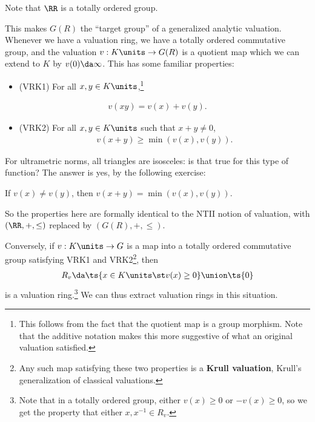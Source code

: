 \begin{remark}

Note that \(\RR\) is a totally ordered group.

\end{remark}

This makes \(G(R)\) the ``target group'' of a generalized analytic
valuation. Whenever we have a valuation ring, we have a totally ordered
commutative group, and the valuation \(v: K\units \to G(R)\) is a
quotient map which we can extend to \(K\) by \(v(0) \da \infty\). This
has some familiar properties:

\begin{itemize}
\tightlist
\item
  (VRK1) For all \(x,y\in K\units\),\footnote{This follows from the fact
    that the quotient map is a group morphism. Note that the additive
    notation makes this more suggestive of what an original valuation
    satisfied.}
\end{itemize}

\begin{align*}  
v(xy) = v(x) + v(y)
.\end{align*}

\begin{itemize}
\tightlist
\item
  (VRK2) For all \(x,y \in K\units\) such that \(x+y\neq 0\),
  \begin{align*}  
  v(x+y) \geq \min(v(x), v(y))
  .\end{align*}
\end{itemize}

For ultrametric norms, all triangles are isosceles: is that true for
this type of function? The answer is yes, by the following exercise:

\begin{exercise}[?]

If \(v(x) \neq v(y)\), then \(v(x+y) = \min(v(x), v(y))\).

\end{exercise}

So the properties here are formally identical to the NTII notion of
valuation, with \((\RR, +, \leq)\) replaced by \((G(R), +, \leq)\).

\begin{exercise}[?]

Conversely, if \(v: K\units \to G\) is a map into a totally ordered
commutative group satisfying VRK1 and VRK2\footnote{Any such map
  satisfying these two properties is a \textbf{Krull valuation}, Krull's
  generalization of classical valuations.}, then
\begin{align*}  
R_v \da \ts {x\in K\units \st v(x) \geq 0} \union \ts{0}
\end{align*} is a valuation ring.\footnote{Note that in a totally
  ordered group, either \(v(x) \geq 0\) or \(-v(x) \geq 0\), so we get
  the property that either \(x, x^{-1} \in R_v\).} We can thus extract
valuation rings in this situation.

\end{exercise}

